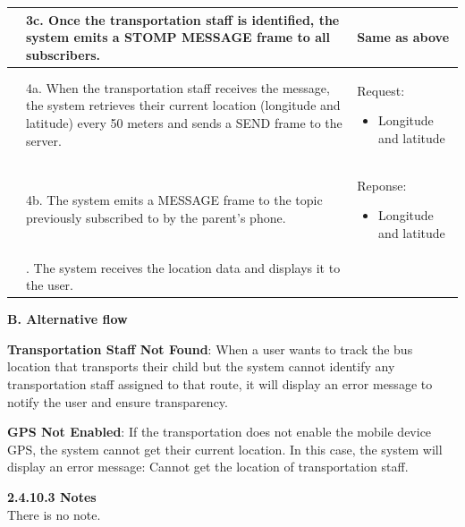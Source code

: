 \begin{longtable}{|>{\raggedright\arraybackslash}p{4.5cm}|
                  >{\raggedright\arraybackslash}p{6cm}|
                  >{\raggedright\arraybackslash}p{4.5cm}|}
\hline
& 3c. Once the transportation staff is identified, the system emits a STOMP MESSAGE frame to all subscribers.&Same as above\\
\hline
&4a. When the transportation staff receives the message, the system retrieves their current location (longitude and latitude) every 50 meters and sends a SEND frame to the server.&
\par{Request:
        \vspace{-0.8em}
        \begin{itemize}
            \item Longitude and latitude
            \vspace{-1.2em}
        \end{itemize}
    }\\
\hline
&4b. The system emits a MESSAGE frame to the topic previously subscribed to by the parent’s phone.&
\par{Reponse:
        \vspace{-0.8em}
        \begin{itemize}
            \item Longitude and latitude
            \vspace{-1.2em}
        \end{itemize}
    }\\
\hline
&5. The system receives the location data and displays it to the user.&\\
\hline
\end{longtable}

\par\indent\indent\textbf{B. Alternative flow}
\vspace{0.6em}
\par\indent\indent\indent\parbox{0.9\textwidth}{\textbf{Transportation Staff Not Found}: When a user wants to track the bus location that transports their child but the system cannot identify any transportation staff assigned to that route, it will display an error message to notify the user and ensure transparency.}
\vspace{0.5em}
\par\indent\indent\indent\parbox{0.9\textwidth}{\textbf{GPS Not Enabled}:  If the transportation does not enable the mobile device GPS, the system cannot get their current location. In this case, the system will display an error message: Cannot get the location of transportation staff.}
\vspace{0.1em}

\indent\textbf{2.4.10.3 Notes}\\
\indent\indent There is no note.
\vspace{0.5em}

